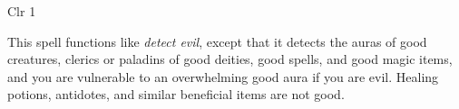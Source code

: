 
\begin{description*}
\item[Level:] Clr 1
\end{description*}

This spell functions like \textit{detect evil}, except that it detects the auras
of good creatures, clerics or paladins of good deities, good spells, and good magic
items, and you are vulnerable to an overwhelming good aura if you are evil. Healing
potions, antidotes, and similar beneficial items are not good.